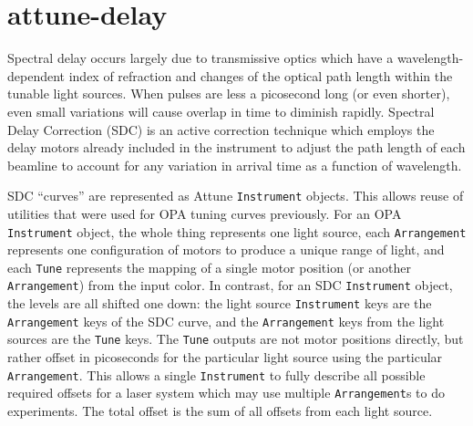 \clearpage

\section{attune-delay}  %

Spectral delay occurs largely due to transmissive optics which have a wavelength-dependent index of refraction and changes of the optical path length within the tunable light sources.
When pulses are less a picosecond long (or even shorter), even small variations will cause overlap in time to diminish rapidly.
Spectral Delay Correction (SDC) is an active correction technique which employs the delay motors already included in the instrument to adjust the path length of each beamline to account for any variation in arrival time as a function of wavelength.

SDC ``curves'' are represented as Attune \texttt{Instrument} objects.
This allows reuse of utilities that were used for OPA tuning curves previously.
For an OPA \texttt{Instrument} object, the whole thing represents one light source, each \texttt{Arrangement} represents one configuration of motors to produce a unique range of light, and each \texttt{Tune} represents the mapping of a single motor position (or another \texttt{Arrangement}) from the input color.
In contrast, for an SDC \texttt{Instrument} object, the levels are all shifted one down: the light source \texttt{Instrument} keys are the \texttt{Arrangement} keys of the SDC curve, and the \texttt{Arrangement} keys from the light sources are the \texttt{Tune} keys.
The \texttt{Tune} outputs are not motor positions directly, but rather offset in picoseconds for the particular light source using the particular \texttt{Arrangement}.
This allows a single \texttt{Instrument} to fully describe all possible required offsets for a laser system which may use multiple \texttt{Arrangement}s to do experiments.
The total offset is the sum of all offsets from each light source.

